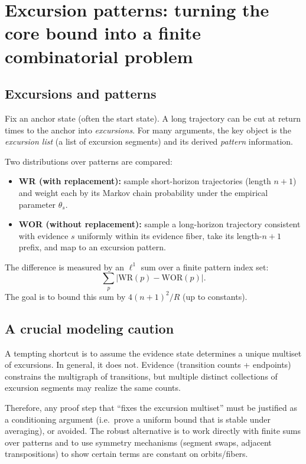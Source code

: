 \documentclass[11pt]{article}
\begin{document}
\section{Excursion patterns: turning the core bound into a finite combinatorial problem}

\subsection{Excursions and patterns}

Fix an anchor state (often the start state).
A long trajectory can be cut at return times to the anchor into \emph{excursions}.
For many arguments, the key object is the \emph{excursion list} (a list of excursion segments)
and its derived \emph{pattern} information.

Two distributions over patterns are compared:

\begin{itemize}
\item \textbf{WR (with replacement):} sample short-horizon trajectories (length $n+1$) and weight
each by its Markov chain probability under the empirical parameter $\theta_s$.

\item \textbf{WOR (without replacement):} sample a long-horizon trajectory consistent with evidence
$s$ uniformly within its evidence fiber, take its length-$n+1$ prefix, and map to an excursion
pattern.
\end{itemize}

The difference is measured by an $\ell^1$ sum over a finite pattern index set:
\[
\sum_{p} \big| \mathrm{WR}(p)-\mathrm{WOR}(p)\big|.
\]
The goal is to bound this sum by $4(n+1)^2/R$ (up to constants).

\subsection{A crucial modeling caution}

A tempting shortcut is to assume the evidence state determines a unique multiset of excursions.
In general, it does not. Evidence (transition counts + endpoints) constrains the multigraph of
transitions, but multiple distinct collections of excursion segments may realize the same counts.

Therefore, any proof step that ``fixes the excursion multiset'' must be justified as a conditioning
argument (i.e.\ prove a uniform bound that is stable under averaging), or avoided.
The robust alternative is to work directly with finite sums over patterns and to use symmetry
mechanisms (segment swaps, adjacent transpositions) to show certain terms are constant on
orbits/fibers.
\end{document}
